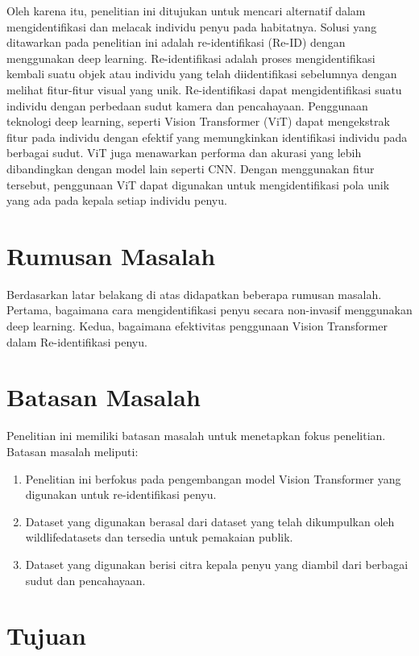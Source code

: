 Oleh karena itu, penelitian ini ditujukan untuk mencari alternatif dalam mengidentifikasi dan melacak individu penyu pada habitatnya.
Solusi yang ditawarkan pada penelitian ini adalah re-identifikasi (Re-ID) dengan menggunakan deep learning.
Re-identifikasi adalah proses mengidentifikasi kembali suatu objek atau individu yang telah diidentifikasi sebelumnya dengan melihat fitur-fitur visual yang unik.
Re-identifikasi dapat mengidentifikasi suatu individu dengan perbedaan sudut kamera dan pencahayaan.
\parencite{zheng2016personreidentificationpastpresent}
Penggunaan teknologi deep learning, seperti Vision Transformer (ViT) dapat mengekstrak fitur pada individu dengan efektif yang memungkinkan identifikasi individu pada berbagai sudut.
ViT juga menawarkan performa dan akurasi yang lebih dibandingkan dengan model lain seperti CNN.
\parencite{9716741}
Dengan menggunakan fitur tersebut, penggunaan ViT dapat digunakan untuk mengidentifikasi pola unik yang ada pada kepala setiap individu penyu.


\section{Rumusan Masalah}

Berdasarkan latar belakang di atas didapatkan beberapa rumusan masalah.
Pertama, bagaimana cara mengidentifikasi penyu secara non-invasif menggunakan deep learning.
Kedua, bagaimana efektivitas penggunaan Vision Transformer dalam Re-identifikasi penyu.

\section{Batasan Masalah}

Penelitian ini memiliki batasan masalah untuk menetapkan fokus penelitian. Batasan masalah meliputi:
\begin{enumerate}
    \item Penelitian ini berfokus pada pengembangan model Vision Transformer yang digunakan untuk re-identifikasi penyu.
    \item Dataset yang digunakan berasal dari dataset yang telah dikumpulkan oleh wildlifedatasets dan tersedia untuk pemakaian publik.
    \item Dataset yang digunakan berisi citra kepala penyu yang diambil dari berbagai sudut dan pencahayaan.
\end{enumerate}

\section{Tujuan}

